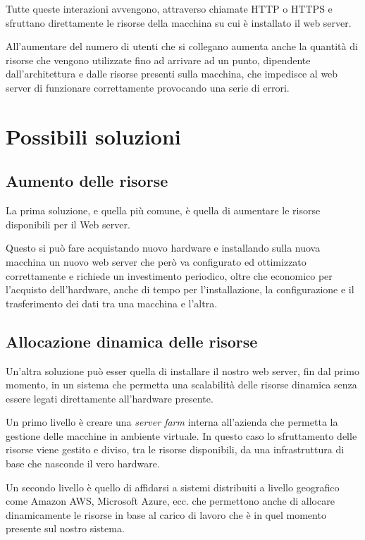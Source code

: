 Tutte queste interazioni avvengono, attraverso chiamate HTTP o HTTPS e sfruttano direttamente le risorse della macchina su cui \`e installato il web server.

All'aumentare del numero di utenti che si collegano aumenta anche la quantit\`a di risorse che vengono utilizzate fino ad arrivare ad un punto, dipendente dall'architettura e dalle risorse presenti sulla macchina, che impedisce al web server di funzionare correttamente provocando una serie di errori.


\section{Possibili soluzioni}

\subsection{Aumento delle risorse}
La prima soluzione, e quella pi\`u comune, \`e quella di aumentare le risorse disponibili per il Web server.

Questo si pu\`o fare acquistando nuovo hardware e installando sulla nuova macchina un nuovo web server che per\`o va configurato ed ottimizzato correttamente e richiede un investimento periodico, oltre che economico per l'acquisto dell'hardware, anche di tempo per l'installazione, la configurazione e il trasferimento dei dati tra una macchina e l'altra.

\subsection{Allocazione dinamica delle risorse}
Un'altra soluzione pu\`o esser quella di installare il nostro web server, fin dal primo momento, in un sistema che permetta una scalabilit\`a delle risorse dinamica senza essere legati direttamente all'hardware presente.

Un primo livello \`e creare una \textit{server farm} interna all'azienda che permetta la gestione delle macchine in ambiente virtuale. In questo caso lo sfruttamento delle risorse viene gestito e diviso, tra le risorse disponibili, da una infrastruttura di base che nasconde il vero hardware.

Un secondo livello \`e quello di affidarsi a sistemi distribuiti a livello geografico come Amazon AWS, Microsoft Azure, ecc. che permettono anche di allocare dinamicamente le risorse in base al carico di lavoro che \`e in quel momento presente sul nostro sistema.

